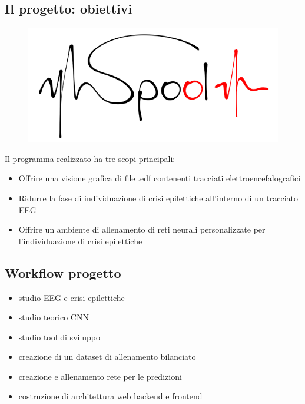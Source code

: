 \documentclass[xcolor=x11names,compress, 
]{beamer}
\theoremstyle{definition} \newtheorem{esempio}{Esempio}
\theoremstyle{definition}
\begin{document}
	\subsection{Il progetto: obiettivi}
		\begin{frame}{\subsecname}
			\begin{figure}
				\includegraphics[scale=0.3]{immagini/prova3-piccolo}
			\end{figure}
			
			Il programma realizzato ha tre scopi principali:\pause
			\begin{itemize}
				\item Offrire una visione grafica di file .edf contenenti tracciati elettroencefalografici \pause
				\item Ridurre la fase di individuazione di crisi epilettiche all'interno di un tracciato EEG \pause
				\item Offrire un ambiente di allenamento di reti neurali personalizzate per l'individuazione di crisi epilettiche
			\end{itemize}
		\end{frame}
		
	\subsection{Workflow progetto}
		\begin{frame}{\subsecname}
			\begin{itemize}
				\item studio EEG e crisi epilettiche\pause
				\item studio teorico CNN\pause
				\item studio tool di sviluppo\pause
				\item creazione di un dataset di allenamento bilanciato\pause
				\item creazione e allenamento rete per le predizioni\pause
				\item costruzione di architettura web backend e frontend
			\end{itemize}
		\end{frame}
	
\end{document}
